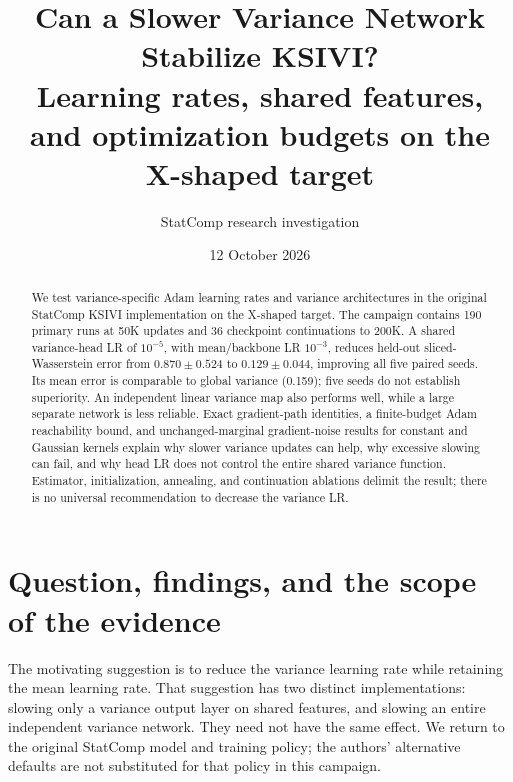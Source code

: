 \documentclass[11pt,a4paper]{article}
\title{Can a Slower Variance Network Stabilize KSIVI?\\
\large Learning rates, shared features, and optimization budgets on the X-shaped target}
\author{StatComp research investigation}\date{12 October 2026}
\begin{document}
\maketitle
\begin{abstract}
We test variance-specific Adam learning rates and variance architectures in the original StatComp KSIVI implementation on the X-shaped target. The campaign contains 190 primary runs at 50K updates and 36 checkpoint continuations to 200K. A shared variance-head LR of $10^{-5}$, with mean/backbone LR $10^{-3}$, reduces held-out sliced-Wasserstein error from $0.870\pm0.524$ to $0.129\pm0.044$, improving all five paired seeds. Its mean error is comparable to global variance (0.159); five seeds do not establish superiority. An independent linear variance map also performs well, while a large separate network is less reliable. Exact gradient-path identities, a finite-budget Adam reachability bound, and unchanged-marginal gradient-noise results for constant and Gaussian kernels explain why slower variance updates can help, why excessive slowing can fail, and why head LR does not control the entire shared variance function. Estimator, initialization, annealing, and continuation ablations delimit the result; there is no universal recommendation to decrease the variance LR.
\end{abstract}

\section{Question, findings, and the scope of the evidence}
The motivating suggestion is to reduce the variance learning rate while retaining
the mean learning rate. That suggestion has two distinct implementations:
slowing only a variance output layer on shared features, and slowing an entire
independent variance network. They need not have the same effect. We return to
the original StatComp model and training policy; the authors' alternative
defaults are not substituted for that policy in this campaign.
\end{document}

